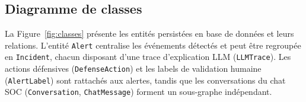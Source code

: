 \documentclass[12pt,a4paper]{report}
\begin{document}
\subsection{Diagramme de classes}
\begin{onehalfspace}
La Figure~\ref{fig:classes} présente les entités persistées en base de
données et leurs relations. L'entité \texttt{Alert} centralise les
événements détectés et peut être regroupée en \texttt{Incident}, chacun
disposant d'une trace d'explication LLM (\texttt{LLMTrace}). Les actions
défensives (\texttt{DefenseAction}) et les labels de validation humaine
(\texttt{AlertLabel}) sont rattachés aux alertes, tandis que les
conversations du chat SOC (\texttt{Conversation}, \texttt{ChatMessage})
forment un sous-graphe indépendant.
\end{onehalfspace}
\end{document}
